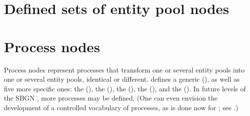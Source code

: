 \section{Defined sets of entity pool nodes}




\section{Process nodes}\label{sec:PNs}

Process nodes represent processes that transform one or several entity pools into one or several entity pools, identical or different.  \SBGNPDLone defines a generic  (), as well as five more specific ones: the  (), the  (), the  (), the  (), and the  ().  In future levels of the SBGN \PDl, more processes may be defined.  (One can even envision the development of a controlled vocabulary of processes, as is done now for ; see .)










